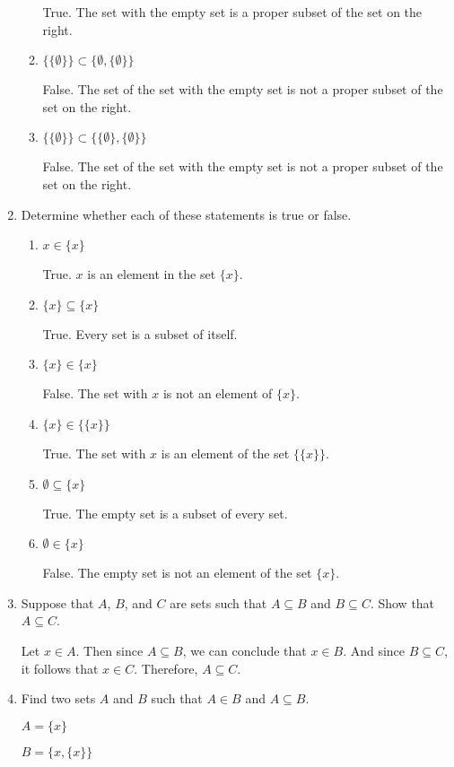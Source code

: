 \documentclass[11pt]{article}
\begin{document}
\begin{enumerate}[label=\textbf{\arabic*.}]
\begin{enumerate}[label=\textbf{\alph*)}]
		True. The set with the empty set is a proper subset of the set on the right.
		
		\item $\{\{\emptyset\}\} \subset \{\emptyset, \{\emptyset\}\}$
		
		False. The set of the set with the empty set is not a proper subset of the set on the right.
		
		\item $\{\{\emptyset\}\} \subset \{\{\emptyset\}, \{\emptyset\}\}$
		
		False. The set of the set with the empty set is not a proper subset of the set on the right.
	\end{enumerate}

	\item Determine whether each of these statements is true or false.
	
	\begin{enumerate}[label=\textbf{\alph*)}]
		\item $x \in \{x\}$
		
		True. $x$ is an element in the set $\{x\}$.
		
		\item $\{x\} \subseteq \{x\}$
		
		True. Every set is a subset of itself.
		
		\item $\{x\} \in \{x\}$
		
		False. The set with $x$ is not an element of $\{x\}$.
		
		\item $\{x\} \in \{\{x\}\}$
		
		True. The set with $x$ is an element of the set $\{\{x\}\}$.
		
		\item $\emptyset \subseteq \{x\}$
		
		True. The empty set is a subset of every set.
		
		\item $\emptyset \in \{x\}$
		
		False. The empty set is not an element of the set $\{x\}$.
	\end{enumerate}

	\item Suppose that $A$, $B$, and $C$ are sets such that $A \subseteq B$ and $B \subseteq C$. Show that $A \subseteq C$.
	
	Let $x \in A$. Then since $A \subseteq B$, we can conclude that $x \in B$. And since $B \subseteq C$, it follows that $x \in C$. Therefore, $A \subseteq C$.
	
	\item Find two sets $A$ and $B$ such that $A \in B$ and $A \subseteq B$.
	
	$A = \{x\}$
	
	$B = \{x, \{x\}\}$
\end{enumerate}
\end{document}
